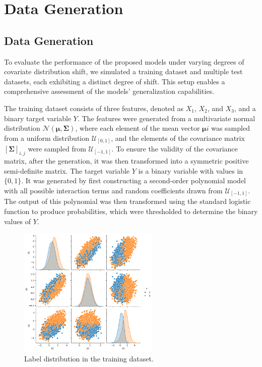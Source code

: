 \chapter{Data Generation}

\section{Data Generation}

To evaluate the performance of the proposed models under varying degrees of covariate distribution shift, we simulated a training dataset and multiple test datasets, each exhibiting a distinct degree of shift. This setup enables a comprehensive assessment of the models’ generalization capabilities.

The training dataset consists of three features, denoted as $X_1$, $X_2$, and $X_3$, and a binary target variable $Y$. The features were generated from a multivariate normal distribution $\mathcal{N}(\boldsymbol{\mu}, \boldsymbol{\Sigma})$, where each element of the mean vector $\boldsymbol{\mu}i$ was sampled from a uniform distribution $\mathcal{U}_{[0, 1]}$, and the elements of the covariance matrix $[\boldsymbol{\Sigma}]_{i,j}$ were sampled from $\mathcal{U}_{[-1, 1]}$. To ensure the validity of the covariance matrix, after the generation, it was then transformed into a symmetric positive semi-definite matrix.
The target variable $Y$ is a binary variable with values in $\{0, 1\}$. It was generated by first constructing a second-order polynomial model with all possible interaction terms and random coefficients drawn from $\mathcal{U}_{[-1, 1]}$. The output of this polynomial was then transformed using the standard logistic function to produce probabilities, which were thresholded to determine the binary values of $Y$.

\begin{figure}
    \centering
    \includegraphics[width=0.6\textwidth]{assets/label_dist_train.png}
    \caption{Label distribution in the training dataset.}
    \label{fig:label_dist_train}
\end{figure}

